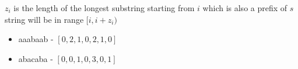 
$z_i$ is the length of the longest substring starting from $i$ which is also a prefix of $s$ string will be in range $[i, i + z_i)$

\begin{itemize}[noitemsep]
  \item aaabaab - $[0, 2, 1, 0, 2, 1, 0]$
  \item abacaba - $[0, 0, 1, 0, 3, 0, 1]$
\end{itemize}